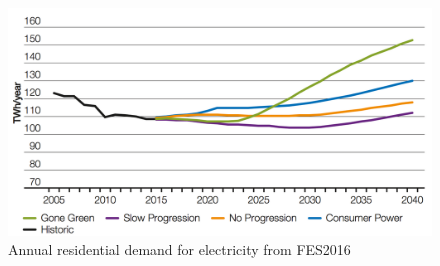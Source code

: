 \begin{figure}\centering
	\includegraphics{_introduction/fig/electricity-demand-forecast}
	\caption{Annual residential demand for electricity from FES2016 \cite{FES2016}}
	\label{ch-introduction:fig:electricity-demand-forecast}
\end{figure}